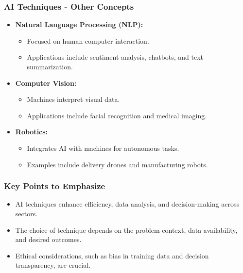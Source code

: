 \documentclass{beamer}
\begin{document}
\begin{frame}
    \frametitle{AI Techniques - Other Concepts}
    \begin{itemize}
        \item \textbf{Natural Language Processing (NLP):}
        \begin{itemize}
            \item Focused on human-computer interaction.
            \item Applications include sentiment analysis, chatbots, and text summarization.
        \end{itemize}
        \item \textbf{Computer Vision:}
        \begin{itemize}
            \item Machines interpret visual data.
            \item Applications include facial recognition and medical imaging.
        \end{itemize}
        \item \textbf{Robotics:}
        \begin{itemize}
            \item Integrates AI with machines for autonomous tasks.
            \item Examples include delivery drones and manufacturing robots.
        \end{itemize}
    \end{itemize}
\end{frame}

\begin{frame}[fragile]
    \frametitle{Key Points to Emphasize}
    \begin{itemize}
        \item AI techniques enhance efficiency, data analysis, and decision-making across sectors.
        \item The choice of technique depends on the problem context, data availability, and desired outcomes.
        \item Ethical considerations, such as bias in training data and decision transparency, are crucial.
    \end{itemize}
\end{frame}
\end{document}
